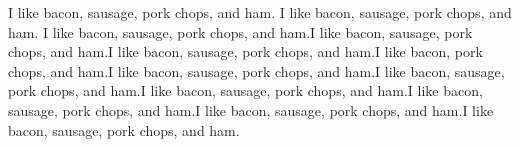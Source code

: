 \documentclass{article}
\begin{document}
I like bacon, sausage, pork chops, and ham. I like bacon, sausage, pork chops, and ham. I like bacon, sausage, pork chops, and ham.I like bacon, sausage, pork chops, and ham.I like bacon, sausage, pork chops, and ham.I like bacon, 
%
%
pork chops, and ham.I like bacon, sausage, pork chops, and ham.I like bacon, sausage, pork chops, and ham.I like bacon, sausage, pork chops, and ham.I like bacon, sausage, pork chops, and ham.I like bacon, sausage, pork chops, and ham.I like bacon, sausage, pork chops, and ham.

\end{document}
